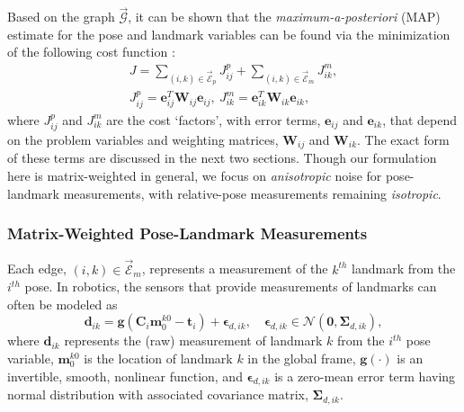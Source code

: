 \documentclass[lettersize,journal]{IEEEtran}
\newcommand{\EdgeSet}{\vec{\bm{\mathcal{E}}}}
\newcommand{\Graph}{\vec{\bm{\mathcal{G}}}}
\begin{document}
Based on the graph $\Graph$, it can be shown that the \emph{maximum-a-posteriori} (MAP) estimate for the pose and landmark variables can be found via the minimization of the following cost function \cite{barfootStateEstimationRobotics2017}:
\begin{equation}\label{eqn:factor_graph}
	\begin{gathered}
		J = \sum\limits_{(i,k)\in\EdgeSet_p}  J_{ij}^{p} + \sum\limits_{(i,k)\in\EdgeSet_m} J_{ik}^{m}, \\ 
		J_{ij}^{p} = \bm{e}_{ij}^T \bm{W}_{ij} \bm{e}_{ij}, ~J_{ik}^{m} = \bm{e}_{ik}^T \bm{W}_{ik} \bm{e}_{ik},
	\end{gathered}
\end{equation}
where $J_{ij}^{p}$ and $J_{ik}^{m}$ are the cost `factors', with error terms, $\bm{e}_{ij}$ and $\bm{e}_{ik}$, that depend on the problem variables and weighting matrices, $\bm{W}_{ij}$ and $\bm{W}_{ik}$. The exact form of these terms are discussed in the next two sections. Though our formulation here is matrix-weighted in general, we focus on \emph{anisotropic} noise for pose-landmark measurements, with relative-pose measurements remaining \emph{isotropic}.

\subsubsection{Matrix-Weighted Pose-Landmark Measurements}\label{sec:LandmarkMeas}

Each edge, $(i,k) \in \EdgeSet_m $, represents a measurement of the $k^{th}$ landmark from the $i^{th}$ pose. In robotics, the sensors that provide measurements of landmarks can often be modeled as
\begin{equation}
	\bm{d}_{ik} = \bm{g}(\bm{C}_i\bm{m}_0^{k0} - \bm{t}_i) + \bm{\epsilon}_{d,ik}, \quad \bm{\epsilon}_{d,ik} \in \mathcal{N}(\bm{0},\bm{\Sigma}_{d,ik}),
\end{equation}
where $ \bm{d}_{ik} $ represents the (raw) measurement of landmark $k$ from the $i^{th}$ pose variable, $\bm{m}_0^{k0}$ is the location of landmark $k$ in the global frame, $ \bm{g}(\cdot) $ is an invertible, smooth, nonlinear function, and $ \bm{\epsilon}_{d,ik} $ is a zero-mean error term having normal distribution with associated covariance matrix, $ \bm{\Sigma}_{d,ik} $. 
\end{document}
